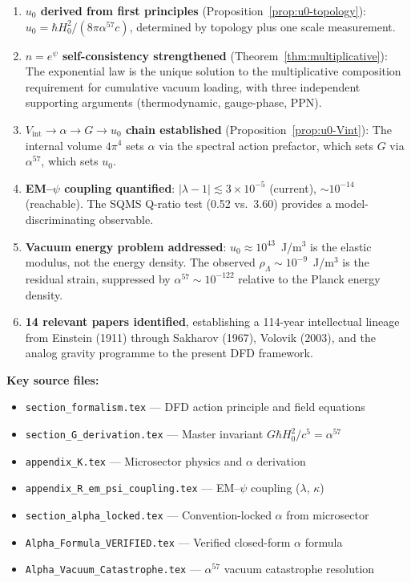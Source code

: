 \documentclass[11pt]{article}
\newcommand{\Vint}{V_{\mathrm{int}}}
\theoremstyle{plain}
\theoremstyle{definition}
\theoremstyle{remark}
\begin{document}
\begin{enumerate}
\item \textbf{$u_0$ derived from first principles}
(Proposition~\ref{prop:u0-topology}):
$u_0 = \hbar H_0^2/(8\pi\alpha^{57}c)$, determined by topology plus
one scale measurement.

\item \textbf{$n = e^\psi$ self-consistency strengthened}
(Theorem~\ref{thm:multiplicative}): The exponential law is the unique
solution to the multiplicative composition requirement for cumulative
vacuum loading, with three independent supporting arguments
(thermodynamic, gauge-phase, PPN).

\item \textbf{$\Vint \to \alpha \to G \to u_0$ chain established}
(Proposition~\ref{prop:u0-Vint}): The internal volume $4\pi^4$ sets
$\alpha$ via the spectral action prefactor, which sets $G$ via
$\alpha^{57}$, which sets $u_0$.

\item \textbf{EM--$\psi$ coupling quantified}:
$|\lambda - 1| \lesssim 3 \times 10^{-5}$ (current),
$\sim 10^{-14}$ (reachable). The SQMS Q-ratio test
(0.52 vs.\ 3.60) provides a model-discriminating observable.

\item \textbf{Vacuum energy problem addressed}:
$u_0 \approx 10^{43}$~J/m$^3$ is the elastic modulus, not the
energy density. The observed $\rho_\Lambda \sim 10^{-9}$~J/m$^3$ is
the residual strain, suppressed by $\alpha^{57} \sim 10^{-122}$
relative to the Planck energy density.

\item \textbf{14 relevant papers identified}, establishing a
114-year intellectual lineage from Einstein (1911) through Sakharov
(1967), Volovik (2003), and the analog gravity programme to the
present DFD framework.
\end{enumerate}

\bigskip
\noindent\textbf{Key source files:}
\begin{itemize}
\item \texttt{section\_formalism.tex} --- DFD action principle and field equations
\item \texttt{section\_G\_derivation.tex} --- Master invariant $G\hbar H_0^2/c^5 = \alpha^{57}$
\item \texttt{appendix\_K.tex} --- Microsector physics and $\alpha$ derivation
\item \texttt{appendix\_R\_em\_psi\_coupling.tex} --- EM--$\psi$ coupling ($\lambda$, $\kappa$)
\item \texttt{section\_alpha\_locked.tex} --- Convention-locked $\alpha$ from microsector
\item \texttt{Alpha\_Formula\_VERIFIED.tex} --- Verified closed-form $\alpha$ formula
\item \texttt{Alpha\_Vacuum\_Catastrophe.tex} --- $\alpha^{57}$ vacuum catastrophe resolution
\end{itemize}
\end{document}
